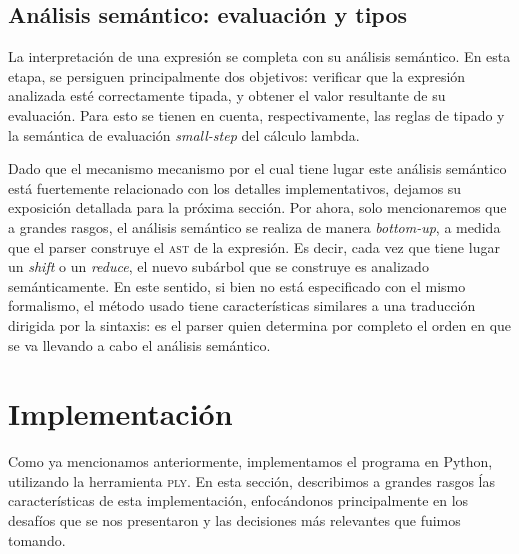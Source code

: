 \documentclass[11pt]{article}
\begin{document}

\subsection{Análisis semántico: evaluación y tipos}

La interpretación de una expresión se completa con su análisis semántico.
En esta etapa, se persiguen principalmente dos objetivos: verificar que la
expresión analizada esté correctamente tipada, y obtener el valor resultante
de su evaluación. Para esto se tienen en cuenta, respectivamente, las reglas
de tipado y la semántica de evaluación \emph{small-step} del cálculo lambda.

Dado que el mecanismo mecanismo por el cual tiene lugar este análisis
semántico está fuertemente relacionado con los detalles implementativos,
dejamos su exposición detallada para la próxima sección.
Por ahora, solo mencionaremos que a grandes rasgos, el análisis semántico se
realiza de manera \emph{bottom-up}, a medida que el parser construye el
\textsc{ast} de la expresión.
Es decir, cada vez que tiene lugar un \emph{shift} o un \emph{reduce},
el nuevo subárbol que se construye es analizado semánticamente.
En este sentido, si bien no está especificado con el mismo formalismo, el
método usado tiene características similares a una traducción dirigida por la
sintaxis: es el parser quien determina por completo el orden en que
se va llevando a cabo el análisis semántico.



\section{Implementación}

Como ya mencionamos anteriormente, implementamos el programa en Python,
utilizando la herramienta \textsc{ply}. En esta sección, describimos a
grandes rasgos ĺas características de esta implementación, enfocándonos
principalmente en los desafíos que se nos presentaron y las decisiones más
relevantes que fuimos tomando.
\end{document}
